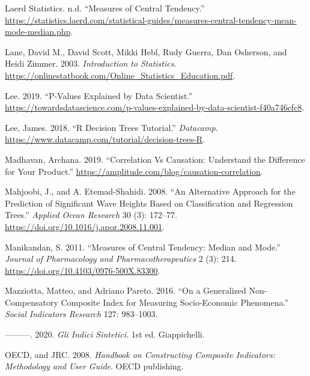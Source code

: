 \documentclass[
]{svmono}
\newlength{\cslhangindent}
\newlength{\cslentryspacingunit} %
\newenvironment{CSLReferences}[2] %
 {%
  \setlength{\parindent}{0pt}
  \ifodd #1
  \let\oldpar\par
  \def\par{\hangindent=\cslhangindent\oldpar}
  \fi
  \setlength{\parskip}{#2\cslentryspacingunit}
 }%
 {}
\begin{document}
\begin{CSLReferences}{1}{0}
\leavevmode{}%
Laerd Statistics. n.d. {``Measures of Central Tendency.''} \url{https://statistics.laerd.com/statistical-guides/measures-central-tendency-mean-mode-median.php}.

\leavevmode{}%
Lane, David M., David Scott, Mikki Hebl, Rudy Guerra, Dan Osherson, and Heidi Zimmer. 2003. \emph{Introduction to Statistics}. \url{https://onlinestatbook.com/Online_Statistics_Education.pdf}.

\leavevmode{}%
Lee. 2019. {``P-Values Explained by Data Scientist.''} \url{https://towardsdatascience.com/p-values-explained-by-data-scientist-f40a746cfc8}.

\leavevmode{}%
Lee, James. 2018. {``R Decision Trees Tutorial.''} \emph{Datacamp}. \url{https://www.datacamp.com/tutorial/decision-trees-R}.

\leavevmode{}%
Madhavan, Archana. 2019. {``Correlation Vs Causation: Understand the Difference for Your Product.''} \url{https://amplitude.com/blog/causation-correlation}.

\leavevmode{}%
Mahjoobi, J., and A. Etemad-Shahidi. 2008. {``An Alternative Approach for the Prediction of Significant Wave Heights Based on Classification and Regression Trees.''} \emph{Applied Ocean Research} 30 (3): 172--77. \url{https://doi.org/10.1016/j.apor.2008.11.001}.

\leavevmode{}%
Manikandan, S. 2011. {``Measures of Central Tendency: Median and Mode.''} \emph{Journal of Pharmacology and Pharmacotherapeutics} 2 (3): 214. \url{https://doi.org/10.4103/0976-500X.83300}.

\leavevmode{}%
Mazziotta, Matteo, and Adriano Pareto. 2016. {``On a Generalized Non-Compensatory Composite Index for Measuring Socio-Economic Phenomena.''} \emph{Social Indicators Research} 127: 983--1003.

\leavevmode{}%
---------. 2020. \emph{Gli Indici Sintetici}. 1st ed. Giappichelli.

\leavevmode{}%
OECD, and JRC. 2008. \emph{Handbook on Constructing Composite Indicators: Methodology and User Guide}. OECD publishing.


\end{CSLReferences}
\end{document}

